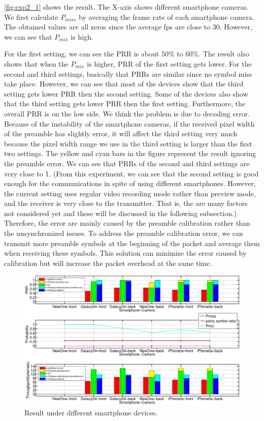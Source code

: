 \autoref{fig:exp2_1} shows the result. The X-axis shows different smartphone cameras. We first calculate $P_{miss}$ by averaging the frame rate of each smartphone camera. The obtained values are all zeros since the average fps are close to 30. However, we can see that $P_{mix}$ is high. 

For the first setting, we can see the PRR is about 50\% to 60\%. The result also shows that when the $P_{mix}$ is higher, PRR of the first setting gets lower.
For the second and third settings, basically that PRRs are similar since no symbol miss take place. However, we can see that most of the devices show that the third setting gets lower PRR then the second setting. Some of the devices also show that the third setting gets lower PRR then the first setting. Furthermore, the overall PRR is on the low side. We think the problem is due to decoding error. Because of the instability of the smartphone cameras, if the received pixel width of the preamble has slightly error, it will affect the third setting very much because the pixel width range we use in the third setting is larger than the first two settings. The yellow and cyan bars in the figure represent the result ignoring the preamble error. We can see that PRRs of the second and third settings are very close to 1. (From this experiment, we can see that the second setting is good enough for the communications in spite of using different smartphones. However, the current setting uses regular video recording mode rather than preview mode, and the receiver is very close to the transmitter. That is, the are many factors not considered yet and these will be discussed in the following subsection.) Therefore, the error are mainly caused by the preamble calibration rather than the unsynchronized issues. To address the preamble calibration error, we can transmit more preamble symbols at the beginning of the packet and average them when receiving these symbols. This solution can minimize the error caused by calibration but will increase the packet overhead at the same time. 

\begin{figure}[!htb]
  \hspace{-3em}
  \includegraphics[scale=0.2]{fig/exp2_refine.eps}
  \caption{Result under different smartphone devices.}
  \label{fig:exp2_1}
\end{figure}

